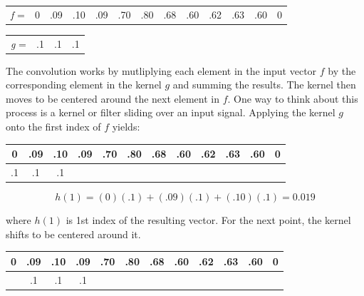 \begin{table}[h!]
    \centering
    \begin{tabular}{c|c|c|c|c|c|c|c|c|c|c|c|c|}
    \cline{2-13}
    \textit{f} = & 0 & .09 & .10 & .09 & .70 & .80 & .68 & .60 & .62 & .63 & .60 & 0 \\ \cline{2-13}
    \end{tabular}
    \label{conv-squares}
\end{table}

\begin{table}[h!]
\centering
    \begin{tabular}{lccc}
    \cline{2-4}
    \multicolumn{1}{l|}{\textit{g} =} & \multicolumn{1}{c|}{.1} & \multicolumn{1}{c|}{.1} & \multicolumn{1}{c|}{.1} \\ \cline{2-4}                 
    \end{tabular}
\end{table}

\noindent The convolution works by mutliplying each element in the input vector $ f $ by the corresponding element in the kernel $ g $ and summing the results. The kernel then moves to be centered around the next element in $ f $. One way to think about this process is a kernel or filter sliding over an input signal. Applying the kernel $ g $ onto the first index of $ f $ yields: 

\begin{table}[h!]
    \centering
    \begin{tabular}{|c|c|c|c|c|c|c|c|c|c|c|c|}
    \hline
    0  & .09 & .10 & .09 & .70 & \multicolumn{1}{c|}{.80} & \multicolumn{1}{c|}{.68} & \multicolumn{1}{c|}{.60} & .62 & .63 & .60 & 0 \\ \hline
    .1 & .1  & .1  &     &     &                          &                          &                          &     &     &     &   \\ \hline
    \end{tabular}
\end{table}
$$ 
h(1) = (0)(.1) + (.09)(.1) + (.10)(.1) = 0.019
$$

\noindent where $ h(1) $ is 1st index of the resulting vector. For the next point, the kernel shifts to be centered around it. 

\begin{table}[h!]
    \centering
    \begin{tabular}{|c|c|c|c|c|c|c|c|c|c|c|c|}
    \hline
    0 & .09 & .10 & .09 & .70 & \multicolumn{1}{c|}{.80} & \multicolumn{1}{c|}{.68} & \multicolumn{1}{c|}{.60} & .62 & .63 & .60 & 0 \\ \hline
      & .1  & .1  & .1  &     &                          &                          &                          &     &     &     &   \\ \hline
    \end{tabular}
\end{table}

